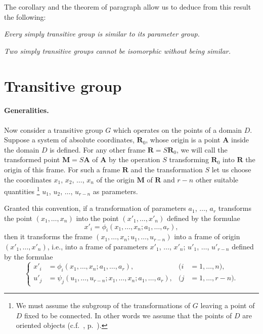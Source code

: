 The corollary and the theorem of paragraph  allow us to deduce from this result the following:

\somespace

\emph{Every simply transitive group is similar to its parameter group.}

\emph{Two simply transitive groups cannot be isomorphic without being similar.}


\section{Transitive group}
\label{sec:transitive-group}

\paragraph{Generalities.}
\label{sec:100}
Now consider a transitive group $G$ which operates on the points of a domain $D$. Suppose a system of absolute coordinates, $\mathbf{R}_{0}$, whose origin is a point $\mathbf{A}$ inside the domain $D$ is defined. For any other frame $\mathbf{R}=S\mathbf{R}_{0}$, we will call the transformed point $\mathbf{M}=S\mathbf{A}$ of $\mathbf{A}$ by the operation $S$ transforming $\mathbf{R}_{0}$ into $\mathbf{R}$ the origin of this frame. For such a frame $\mathbf{R}$ and the transformation $S$ let us choose the coordinates $x_{1}$, $x_{2}$, $\dots$, $x_{n}$ of the origin $\mathbf{M}$ of $\mathbf{R}$ and $r-n$ other suitable quantities \footnote{We must assume the subgroup of the transformations of $G$ leaving a point of $D$ fixed to be connected. In other words we assume that the points of $D$ are oriented objects (c.f.~, p.~\pageref{sec:93}).} $u_{1}$, $u_{2}$, $\dots$, $u_{r-n}$ as parameters.

Granted this convention, if a transformation of parameters $a_{1}$, $\dots$, $a_{r}$ transforms the point $(x_{1},\dots, x_{n})$ into the point $(x'_{1},\dots, x'_{n})$ defined by the formulae
\begin{equation}
  \label{eq:7.1}
  x'_{i}=\phi_{i}(x_{1},\dots,x_{n};a_{1},\dots,a_{r}),
\end{equation}
then it transforms the frame $(x_{1},\dots,x_{n};u_{1},\dots,u_{r-n})$ into a frame of origin $(x'_{1},\dots,x'_{n})$, i.e., into a frame of parameters $x'_{1}$, $\dots$, $x'_{n}$; $u'_{1}$, $\dots$, $u'_{r-n}$ defined by the formulae
\begin{equation}
  \label{eq:7.2}
  \left\{
    \begin{aligned}
      x'_{i}&=\phi_{i}(x_{1},\dots,x_{n};a_{1},\dots,a_{r}),&(i&=1,\dots,n),\\
      u'_{j}&=\psi_{j}(u_{1},\dots,u_{r-n};x_{1},\dots,x_{n};a_{1},\dots,a_{r}),&(j&=1,\dots,r-n).      
    \end{aligned}
  \right.
\end{equation}


